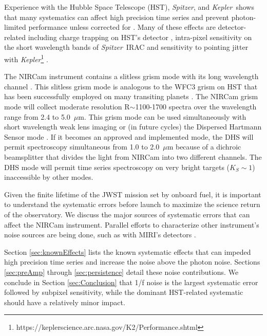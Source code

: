 \documentclass[]{aastex62}
\newcommand{\spitzer}{{\it Spitzer}}
\newcommand{\kepler}{{\it Kepler}}
\begin{document}
Experience with the Hubble Space Telescope (HST), \spitzer, and \kepler\ shows that many systematics can affect high precision time series and prevent photon-limited performance unless corrected for \citep[e.g.][]{beichman2014pasp}.
Many of these effects are detector-related including charge trapping on HST's detector \citep{berta2012flat_gj1214,zhou2017chargeTrap}, intra-pixel sensitivity on the short wavelength bands of \spitzer\ IRAC \citep{moralesCalderon2006LdwarfsWeatherIPC} and sensitivity to pointing jitter with \kepler\footnote{https://keplerscience.arc.nasa.gov/K2/Performance.shtml} \citep[e.g.][]{vanderburg2014twoWheeledKeplerPhot,beichman2014pasp}.

The NIRCam instrument \citep{rieke2005nircamSPIE} contains a slitless grism mode with its long wavelength channel \citep{greene2017jatisNIRCam}.
This slitless grism mode is analogous to the WFC3 grism on HST that has been successfully employed on many transiting planets \citep[e.g.][]{deming13,kreidberg2014wasp43,sing2016continuum,wakeford2017hatp26}.
The NIRCam grism mode will collect moderate resolution R$\sim$1100-1700 spectra over the wavelength range from 2.4 to 5.0~$\mu$m.
This grism mode can be used simultaneously with short wavelength weak lens imaging or (in future cycles) the Dispersed Hartmann Sensor mode \citep{schlawin2017dhs}. If it becomes an approved and implemented mode, the DHS will permit spectroscopy simultaneous from 1.0 to 2.0~$\mu$m because of a dichroic beamsplitter that divides the light from NIRCam into two different channels.
The DHS mode will permit time series spectroscopy on very bright targets ($K_S \sim 1$) inaccessible by other modes.

Given the finite lifetime of the JWST mission set by onboard fuel, it is important to understand the systematic errors before launch to maximize the science return of the observatory.
We discuss the major sources of systematic errors that can affect the NIRCam instrument.
Parallel efforts to characterize other instrument's noise sources are being done, such as with MIRI's detectors \citep{matuso2019siAsDetectorStability}.

Section \ref{sec:knownEffects} lists the known systematic effects that can impeded high precision time series and increase the noise above the photon noise.
Sections \ref{sec:preAmp} through \ref{sec:persistence} detail these noise contributions.
We conclude in Section \ref{sec:Conclusion} that 1/f noise is the largest systematic error followed by subpixel sensitivity, while the dominant HST-related systematic should have a relatively minor impact.
\end{document}
